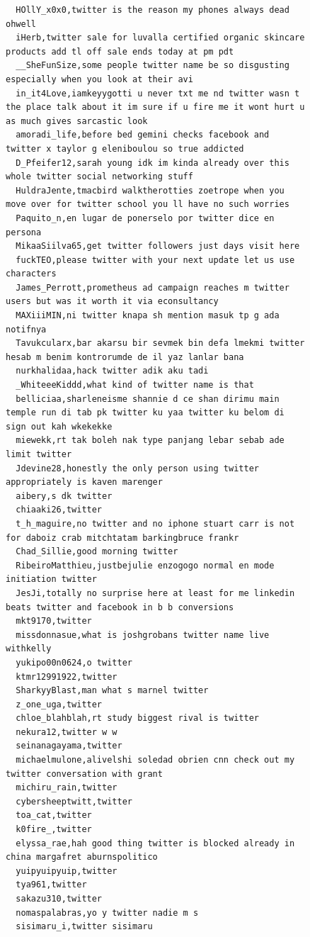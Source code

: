 \begin{figure}[htpb]
\begin{verbatim}
  HOllY_x0x0,twitter is the reason my phones always dead ohwell
  iHerb,twitter sale for luvalla certified organic skincare products add tl off sale ends today at pm pdt
  __SheFunSize,some people twitter name be so disgusting especially when you look at their avi
  in_it4Love,iamkeyygotti u never txt me nd twitter wasn t the place talk about it im sure if u fire me it wont hurt u as much gives sarcastic look
  amoradi_life,before bed gemini checks facebook and twitter x taylor g eleniboulou so true addicted
  D_Pfeifer12,sarah young idk im kinda already over this whole twitter social networking stuff
  HuldraJente,tmacbird walktherotties zoetrope when you move over for twitter school you ll have no such worries
  Paquito_n,en lugar de ponerselo por twitter dice en persona
  MikaaSiilva65,get twitter followers just days visit here
  fuckTEO,please twitter with your next update let us use characters
  James_Perrott,prometheus ad campaign reaches m twitter users but was it worth it via econsultancy
  MAXiiiMIN,ni twitter knapa sh mention masuk tp g ada notifnya
  Tavukcularx,bar akarsu bir sevmek bin defa lmekmi twitter hesab m benim kontrorumde de il yaz lanlar bana
  nurkhalidaa,hack twitter adik aku tadi
  _WhiteeeKiddd,what kind of twitter name is that
  belliciaa,sharleneisme shannie d ce shan dirimu main temple run di tab pk twitter ku yaa twitter ku belom di sign out kah wkekekke
  miewekk,rt tak boleh nak type panjang lebar sebab ade limit twitter
  Jdevine28,honestly the only person using twitter appropriately is kaven marenger
  aibery,s dk twitter
  chiaaki26,twitter
  t_h_maguire,no twitter and no iphone stuart carr is not for daboiz crab mitchtatam barkingbruce frankr
  Chad_Sillie,good morning twitter
  RibeiroMatthieu,justbejulie enzogogo normal en mode initiation twitter
  JesJi,totally no surprise here at least for me linkedin beats twitter and facebook in b b conversions
  mkt9170,twitter
  missdonnasue,what is joshgrobans twitter name live withkelly
  yukipo00n0624,o twitter
  ktmr12991922,twitter
  SharkyyBlast,man what s marnel twitter
  z_one_uga,twitter
  chloe_blahblah,rt study biggest rival is twitter
  nekura12,twitter w w
  seinanagayama,twitter
  michaelmulone,alivelshi soledad obrien cnn check out my twitter conversation with grant
  michiru_rain,twitter
  cybersheeptwitt,twitter
  toa_cat,twitter
  k0fire_,twitter
  elyssa_rae,hah good thing twitter is blocked already in china margafret aburnspolitico
  yuipyuipyuip,twitter
  tya961,twitter
  sakazu310,twitter
  nomaspalabras,yo y twitter nadie m s
  sisimaru_i,twitter sisimaru

\end{verbatim}
\end{figure}

